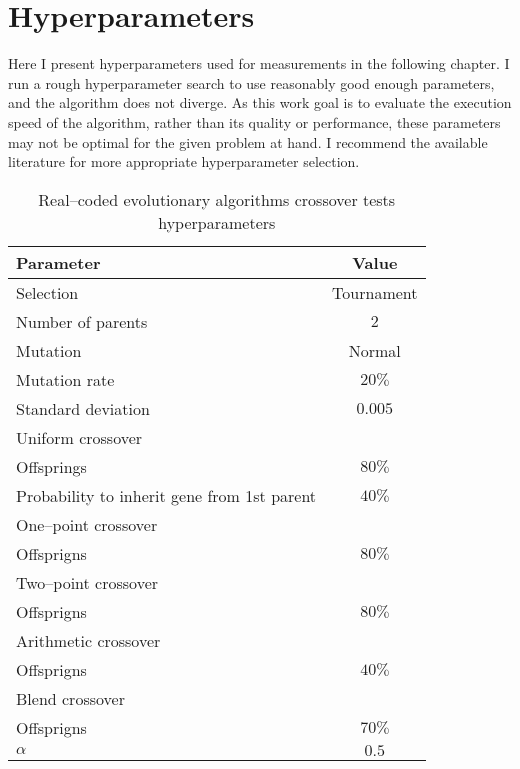 \chapter{Hyperparameters}
\label{chap:hyperparameters}

Here I present hyperparameters used for measurements in the following chapter. I run a rough hyperparameter search to use reasonably good enough parameters, and the algorithm does not diverge. As this work goal is to evaluate the execution speed of the algorithm, rather than its quality or performance, these parameters may not be optimal for the given problem at hand. I recommend the available literature for more appropriate hyperparameter selection. 

\begin{table}[h]
    \centering
    \begin{tabular}{|l|c|}
        \hline
        \textbf{Parameter} & \textbf{Value} \\
        \hline
        Selection & Tournament \\
        \quad Number of parents & $2$ \\
        Mutation & Normal \\
        \quad Mutation rate & $20\%$ \\
        \quad Standard deviation & $0.005$ \\
        \hline
        Uniform crossover & \\
        \quad Offsprings & $80\%$ \\
        \quad Probability to inherit gene from 1st parent & $40\%$ \\
        One--point crossover & \\
        \quad Offsprigns & $80\%$ \\
        Two--point crossover & \\
        \quad Offsprigns & $80\%$ \\
        Arithmetic crossover & \\
        \quad Offsprigns & $40\%$ \\
        Blend crossover & \\
        \quad Offsprigns & $70\%$ \\
        \quad $\alpha$ & $0.5$ \\
        \hline
    \end{tabular}
    \caption{Real--coded evolutionary algorithms crossover tests hyperparameters}
    \label{tab:escrossoverhyperparmarameters}
\end{table}

